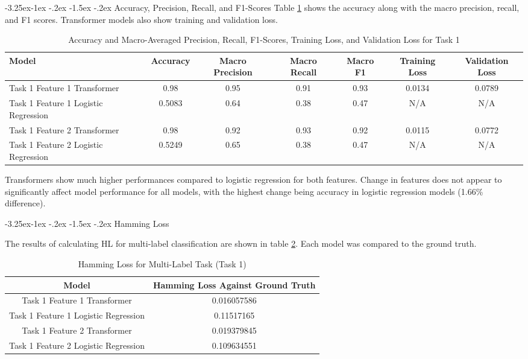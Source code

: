 \documentclass[10.7pt, onecolumn]{article}
\makeatletter
\renewcommand\subsubsection{\@startsection{subsubsection}{3}{\z@}%
	{-3.25ex\@plus -1ex \@minus -.2ex}%
    {-1.5ex \@plus -.2ex}%
    {\normalfont\itshape}}
\makeatother
\begin{document}
\subsubsection{Accuracy, Precision, Recall, and F1-Scores}
Table \ref{tab:task1accEtc} shows the accuracy along with the macro precision, recall, and F1 scores. Transformer models also show training and validation loss.
\begin{table}[h]
  \small
  \centering
  \setlength{\tabcolsep}{4pt}
  \begin{tabular}{|p{3cm}|c|c|c|c|c|c|}
    \hline
    \textbf{Model} & \textbf{Accuracy} & \textbf{Macro Precision} & \textbf{Macro Recall} & \textbf{Macro F1}  & \textbf{Training Loss} & \textbf{Validation Loss}\\
    \hline
    Task 1 Feature 1 Transformer & 0.98  & 0.95  & 0.91  & 0.93 & 0.0134 & 0.0789 \\
    \hline
    Task 1 Feature 1 Logistic Regression & 0.5083 & 0.64  & 0.38  & 0.47 &N/A &N/A \\
    \hline
    Task 1 Feature 2 Transformer & 0.98  & 0.92  & 0.93  & 0.92 &0.0115 &0.0772 \\
    \hline
    Task 1 Feature 2 Logistic Regression & 0.5249 & 0.65  & 0.38  & 0.47 &N/A &N/A \\
    \hline
  \end{tabular}
  \caption{Accuracy and Macro-Averaged Precision, Recall, F1-Scores, Training Loss, and Validation Loss for Task 1}
  \label{tab:task1accEtc}
\end{table}

Transformers show much higher performances compared to logistic regression for both features. Change in features does not appear to significantly affect model performance for all models, with the highest change being accuracy in logistic regression models (1.66\% difference).

\subsubsection{Hamming Loss}

The results of calculating HL for multi-label classification are shown in table \ref{tab:hammingL}. Each model was compared to the ground truth.

\begin{table}[h!]
  \centering
  \small
  \begin{tabular}{|c|c|}
      \hline
      \textbf{Model} & \textbf{Hamming Loss Against Ground Truth} \\ \hline
      Task 1 Feature 1 Transformer & 0.016057586 \\ \hline
      Task 1 Feature 1 Logistic Regression      & 0.11517165  \\ \hline
      Task 1 Feature 2 Transformer & 0.019379845 \\ \hline
      Task 1 Feature 2 Logistic Regression      & 0.109634551 \\ \hline
  \end{tabular}
  \caption{Hamming Loss for Multi-Label Task (Task 1)}
  \label{tab:hammingL}
\end{table}
\end{document}
